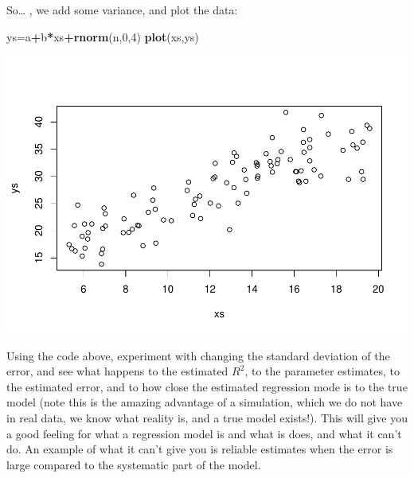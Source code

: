 \documentclass[
]{book}
\newenvironment{Shaded}{\begin{snugshade}}{\end{snugshade}}
\newcommand{\DecValTok}[1]{\textcolor[rgb]{0.00,0.00,0.81}{#1}}
\newcommand{\KeywordTok}[1]{\textcolor[rgb]{0.13,0.29,0.53}{\textbf{#1}}}
\newcommand{\NormalTok}[1]{#1}
\newcommand{\OperatorTok}[1]{\textcolor[rgb]{0.81,0.36,0.00}{\textbf{#1}}}
\begin{document}
So\ldots{} , we add some variance, and plot the data:

\begin{Shaded}
\begin{Highlighting}[]
\NormalTok{ys=a}\OperatorTok{+}\NormalTok{b}\OperatorTok{*}\NormalTok{xs}\OperatorTok{+}\KeywordTok{rnorm}\NormalTok{(n,}\DecValTok{0}\NormalTok{,}\DecValTok{4}\NormalTok{)}
\KeywordTok{plot}\NormalTok{(xs,ys)}
\end{Highlighting}
\end{Shaded}

\includegraphics{ECOMODbook_files/figure-latex/a6.25-1.pdf}

Using the code above, experiment with changing the standard deviation of the error, and see what happens to the estimated \(R^2\), to the parameter estimates, to the estimated error, and to how close the estimated regression mode is to the true model (note this is the amazing advantage of a simulation, which we do not have in real data, we know what reality is, and a true model exists!). This will give you a good feeling for what a regression model is and what is does, and what it can't do. An example of what it can't give you is reliable estimates when the error is large compared to the systematic part of the model.
\end{document}
